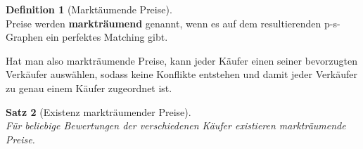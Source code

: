 \documentclass[a4paper]{scrreprt}
\theoremstyle{plain} %
\newtheorem{theorem}{Satz}[chapter]
\theoremstyle{definition} %
\newtheorem{definition}[theorem]{Definition}
\begin{document}
\begin{definition}[Marktäumende Preise] ~\\
Preise werden \textbf{markträumend} genannt, wenn es auf dem resultierenden p-s-Graphen
ein perfektes Matching gibt.
\end{definition}

\noindent
Hat man also markträumende Preise, kann jeder Käufer einen seiner bevorzugten Verkäufer auswählen,
sodass keine Konflikte entstehen und damit jeder Verkäufer zu genau einem Käufer zugeordnet ist.


\begin{theorem}[Existenz markträumender Preise] ~\\
Für beliebige Bewertungen der verschiedenen Käufer existieren markträumende Preise. 
\label{theo:existprice}
\end{theorem}
\end{document}
